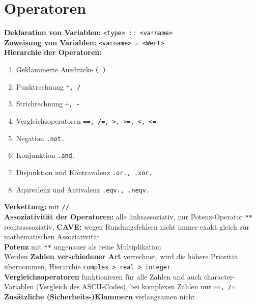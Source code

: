\documentclass[a4paper, twocolumn]{scrarticle}
\begin{document}
  \section{Operatoren}
  \textbf{Deklaration von Variablen:} \lstinline|<type> :: <varname>|\\
  \textbf{Zuweisung von Variablen:} \lstinline|<varname> = <Wert>|\\
  \textbf{Hierarchie der Operatoren:}
  \begin{enumerate}
    \item Geklammerte Ausdrücke \lstinline|( )|
    \item Punktrechnung \lstinline|*, /|
    \item Strichrechnung \lstinline|+, -|
    \item Vergleichsoperatoren \lstinline|==, /=, >, >=, <, <=|
    \item Negation \lstinline|.not.|
    \item Konjunktion \lstinline|.and.|
    \item Disjunktion und Kontravalenz \lstinline|.or., .xor.|
    \item Äquivalenz und Antivalenz \lstinline|.eqv., .neqv.|
  \end{enumerate}
  \textbf{Verkettung:} mit \lstinline|//|\\
  \textbf{Assoziativität der Operatoren:} alle linksassoziativ, nur Potenz-Operator \lstinline|**| rechtsassoziativ, \textbf{CAVE:} wegen Rundungsfehlern nicht immer exakt gleich zur mathematischen Assoziativität\\
  \textbf{Potenz} mit \lstinline|**| ungenauer als reine Multiplikation\\
  Werden \textbf{Zahlen verschiedener Art} verrechnet, wird die höhere Priorität übernommen, Hierarchie \lstinline|complex > real > integer|\\
  \textbf{Vergleichsoperatoren} funktionieren für alle Zahlen und auch character-Variablen (Vergleich des ASCII-Codes), bei komplexen Zahlen nur \lstinline|==, /=|\\
  \textbf{Zusätzliche (Sicherheits-)Klammern} verlangsamen nicht
  
\end{document}
